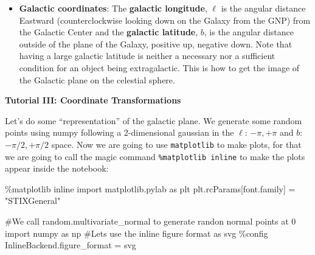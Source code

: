 \documentclass[
  letterpaper,
  DIV=11,
  numbers=noendperiod]{scrreprt}
\newenvironment{Shaded}{\begin{snugshade}}{\end{snugshade}}
\newcommand{\CommentTok}[1]{\textcolor[rgb]{0.37,0.37,0.37}{#1}}
\newcommand{\ImportTok}[1]{\textcolor[rgb]{0.00,0.46,0.62}{#1}}
\newcommand{\NormalTok}[1]{\textcolor[rgb]{0.00,0.23,0.31}{#1}}
\newcommand{\OperatorTok}[1]{\textcolor[rgb]{0.37,0.37,0.37}{#1}}
\newcommand{\StringTok}[1]{\textcolor[rgb]{0.13,0.47,0.30}{#1}}
\providecommand{\tightlist}{%
  \setlength{\itemsep}{0pt}\setlength{\parskip}{0pt}}\usepackage{longtable,booktabs,array}
\begin{document}
\begin{itemize}
\tightlist
\item
  \textbf{Galactic coordinates}: The \textbf{galactic longitude},
  \(\ell\) is the angular distance Eastward (counterclockwise looking
  down on the Galaxy from the GNP) from the Galactic Center and the
  \textbf{galactic latitude}, \(b\), is the angular distance outside of
  the plane of the Galaxy, positive up, negative down. Note that having
  a large galactic latitude is neither a necessary nor a sufficient
  condition for an object being extragalactic. This is how to get the
  image of the Galactic plane on the celestial sphere.
\end{itemize}

\begin{tcolorbox}[enhanced jigsaw, toprule=.15mm, colframe=quarto-callout-color-frame, bottomrule=.15mm, leftrule=.75mm, left=2mm, breakable, rightrule=.15mm, arc=.35mm, opacityback=0, colback=white]

\vspace{-3mm}\textbf{Tutorial III: Coordinate Transformations}\vspace{3mm}

Let's do some ``representation'' of the galactic plane. We generate some
random points using numpy following a 2-dimensional gaussian in the
\(\ell\): \(-\pi, +\pi\) and \(b\):\(-\pi/2, +\pi/2\) space. Now we are
going to use \texttt{matplotlib} to make plots, for that we are going to
call the magic command \texttt{\%matplotlib\ inline} to make the plots
appear inside the notebook:

\begin{Shaded}
\begin{Highlighting}[]
\OperatorTok{\%}\NormalTok{matplotlib inline}
\ImportTok{import}\NormalTok{ matplotlib.pylab }\ImportTok{as}\NormalTok{ plt}
\NormalTok{plt.rcParams[}\StringTok{\textquotesingle{}font.family\textquotesingle{}}\NormalTok{] }\OperatorTok{=} \StringTok{"STIXGeneral"}

\CommentTok{\#We call random.multivariate\_normal to generate randon normal points at 0}
\ImportTok{import}\NormalTok{ numpy }\ImportTok{as}\NormalTok{ np}
\CommentTok{\#Lets use the inline figure format as svg}
\OperatorTok{\%}\NormalTok{config InlineBackend.figure\_format }\OperatorTok{=} \StringTok{\textquotesingle{}svg\textquotesingle{}}


\end{Highlighting}
\end{Shaded}
\end{tcolorbox}
\end{document}
